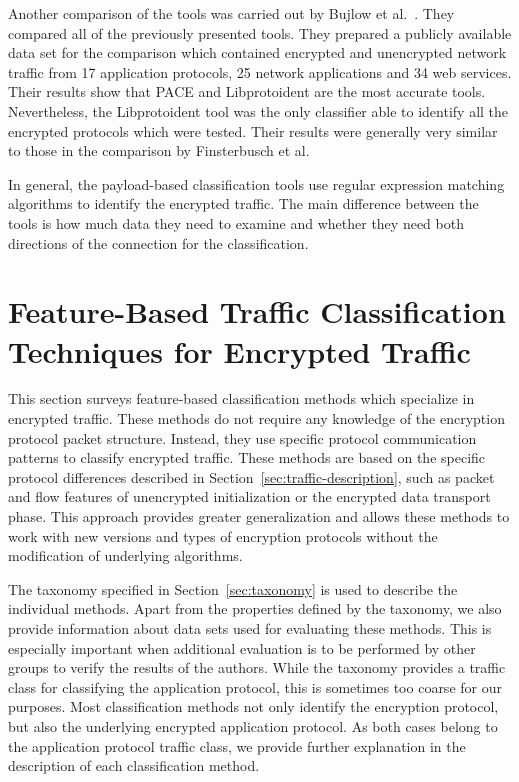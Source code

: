 Another comparison of the tools was carried out by Bujlow et al.~\cite{Bujlow-2015-classification}. They compared all of the previously presented tools. They prepared a publicly available data set for the comparison which contained encrypted and unencrypted network traffic from 17 application protocols, 25 network applications and 34 web services. Their results show that PACE and Libprotoident are the most accurate tools. Nevertheless, the Libprotoident tool was the only classifier able to identify all the encrypted protocols which were tested. Their results were generally very similar to those in the comparison by Finsterbusch et al.

In general, the payload-based classification tools use regular expression matching algorithms to identify the encrypted traffic. The main difference between the tools is how much data they need to examine and whether they need both directions of the connection for the classification.




\section{Feature-Based Traffic Classification Techniques for Encrypted Traffic}\label{sec:detection}


This section surveys feature-based classification methods which specialize in encrypted traffic. These methods do not require any knowledge of the encryption protocol packet structure. Instead, they use specific protocol communication patterns to classify encrypted traffic. These methods are based on the specific protocol differences described in Section~\ref{sec:traffic-description}, such as packet and flow features of unencrypted initialization or the encrypted data transport phase. This approach provides greater generalization and allows these methods to work with new versions and types of encryption protocols without the modification of underlying algorithms.

The taxonomy specified in Section~\ref{sec:taxonomy} is used to describe the individual methods. Apart from the properties defined by the taxonomy, we also provide information about data sets used for evaluating these methods. This is especially important when additional evaluation is to be performed by other groups to verify the results of the authors. While the taxonomy provides a traffic class for classifying the application protocol, this is sometimes too coarse for our purposes. Most classification methods not only identify the encryption protocol, but also the underlying encrypted application protocol. As both cases belong to the application protocol traffic class, we provide further explanation in the description of each classification method.

